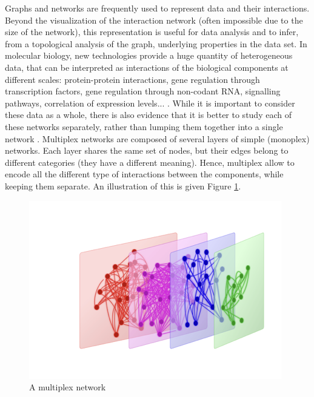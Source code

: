 \documentclass{report}
\theoremstyle{definition}
\theoremstyle{remark}
\begin{document}
Graphs and networks are frequently used to represent data and their interactions. Beyond the visualization of the interaction network (often impossible due to the size of the network), this representation is useful for data analysis and to infer, from a topological analysis of the graph, underlying properties in the data set.
In molecular biology, new technologies provide a huge quantity of heterogeneous data, that can be interpreted as interactions of the biological components at different scales: protein-protein interactions, gene regulation through transcription factors, gene regulation through non-codant RNA, signalling pathways, correlation of expression levels... \cite{lenovere}. While it is important to consider these data as a whole, there is also evidence that it is better to study each of these networks separately, rather than lumping them together into a single network \cite{didier}.  
Multiplex networks are composed of several layers of simple (monoplex) networks. Each layer shares the same set of nodes, but their edges belong to different categories (they have a different meaning).
Hence, multiplex allow to encode all the different type of interactions between the components, while keeping them separate. An illustration of this is given Figure \ref{multiplex}.%

\begin{figure}
\centerline{
    \includegraphics[scale = .5]{multiplex_white.png}}
    \caption{A multiplex network}
    \label{multiplex}
\end{figure}
\end{document}
